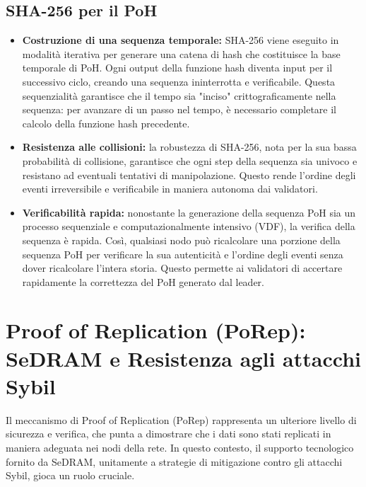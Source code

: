 \documentclass[a4paper,12pt]{report}
\begin{document}
	\subsection{SHA-256 per il PoH}
	\begin{itemize}
		\item \textbf{Costruzione di una sequenza temporale:} SHA-256 viene eseguito in modalità iterativa per generare una catena di hash che costituisce la base temporale di PoH. Ogni output della funzione hash diventa input per il successivo ciclo, creando una sequenza ininterrotta e verificabile. Questa sequenzialità garantisce che il tempo sia "inciso" crittograficamente nella sequenza: per avanzare di un passo nel tempo, è necessario completare il calcolo della funzione hash precedente.
		\item \textbf{Resistenza alle collisioni:} la robustezza di SHA-256, nota per la sua bassa probabilità di collisione, garantisce che ogni step della sequenza sia univoco e resistano ad eventuali tentativi di manipolazione. Questo rende l'ordine degli eventi irreversibile e verificabile in maniera autonoma dai validatori.
		\item \textbf{Verificabilità rapida:} nonostante la generazione della sequenza PoH sia un processo sequenziale e computazionalmente intensivo (VDF), la verifica della sequenza è rapida. Così, qualsiasi nodo può ricalcolare una porzione della sequenza PoH per verificare la sua autenticità e l'ordine degli eventi senza dover ricalcolare l'intera storia. Questo permette ai validatori di accertare rapidamente la correttezza del PoH generato dal leader.
	\end{itemize}
	
	\section{Proof of Replication (PoRep): SeDRAM e Resistenza agli attacchi Sybil}
	Il meccanismo di Proof of Replication (PoRep) rappresenta un ulteriore livello di sicurezza e verifica, che punta a dimostrare che i dati sono stati replicati in maniera adeguata nei nodi della rete. In questo contesto, il supporto tecnologico fornito da SeDRAM, unitamente a strategie di mitigazione contro gli attacchi Sybil, gioca un ruolo cruciale.
	
\end{document}
